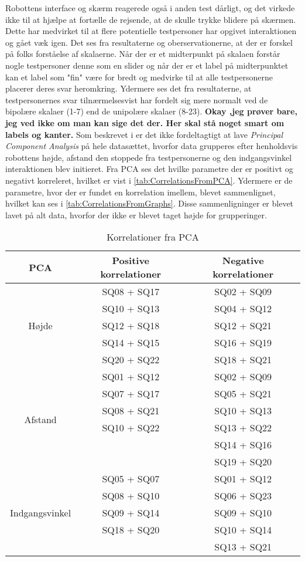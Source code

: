 Robottens interface og skærm reagerede også i anden test dårligt, og det virkede ikke til at hjælpe at fortælle de rejsende, at de skulle trykke blidere på skærmen. Dette har medvirket til at flere potentielle testpersoner har opgivet interaktionen og gået væk igen.\blankline
%
Det ses fra resultaterne og oberservationerne, at der er forskel på folks forståelse af skalaerne. Når der er et midterpunkt på skalaen forstår nogle testpersoner denne som en slider og når der er et label på midterpunktet kan et label som "fin" være for bredt og medvirke til at alle testpersonerne placerer deres svar heromkring. Ydermere ses det fra resultaterne, at testpersonernes svar tilnærmelsesvist har fordelt sig mere normalt ved de bipolære skalaer (1-7) end de unipolære skalaer (8-23). \textbf{Okay ,jeg prøver bare, jeg ved ikke om man kan sige det der. Her skal stå noget smart om labels og kanter.}\blankline
%
Som beskrevet i  er det ikke fordeltagtigt at lave \textit{Principal Component Analysis} på hele datasættet, hvorfor data grupperes efter henholdsvis robottens højde, afstand den stoppede fra testpersonerne og den indgangsvinkel interaktionen blev initieret. Fra PCA ses det hvilke parametre der er positivt og negativt korreleret, hvilket er vist i \autoref{tab:CorrelationsFromPCA}. Ydermere er de parametre, hvor der er fundet en korrelation imellem, blevet sammenlignet, hvilket kan ses i \autoref{tab:CorrelationsFromGraphs}. Disse sammenligninger er blevet lavet på alt data, hvorfor der ikke er blevet taget højde for grupperinger.\blankline
%
\begin{table}[H]
	\centering
	\begin{tabular}{ c|c|c }
		\centering
		PCA & Positive korrelationer & Negative korrelationer \\ \hline
		\multirow{5}{*}{Højde} & SQ08  + SQ17 & SQ02  + SQ09 \\
		& SQ10 + SQ13 & SQ04 + SQ12 \\
		& SQ12 + SQ18 & SQ12 + SQ21 \\
		& SQ14 + SQ15 & SQ16 + SQ19 \\
		& SQ20 + SQ22 & SQ18 + SQ21\\ \hline
		\multirow{6}{*}{Afstand} & SQ01 + SQ12 & SQ02 + SQ09 \\
		& SQ07 + SQ17 & SQ05 + SQ21 \\
		& SQ08 + SQ21 & SQ10 + SQ13 \\
		& SQ10 + SQ22 & SQ13 + SQ22 \\
		&  & SQ14 + SQ16 \\	
		&  & SQ19 + SQ20 \\ \hline	
		\multirow{5}{*}{Indgangsvinkel} 
		& SQ05 + SQ07 & SQ01 + SQ12 \\
		& SQ08 + SQ10 & SQ06 + SQ23 \\
		& SQ09 + SQ14 & SQ09 + SQ10 \\
		& SQ18 + SQ20 & SQ10 + SQ14 \\
		&  & SQ13 + SQ21
		
	\end{tabular}        
\caption{Korrelationer fra PCA}
\label{tab:CorrelationsFromPCA}
\end{table}
